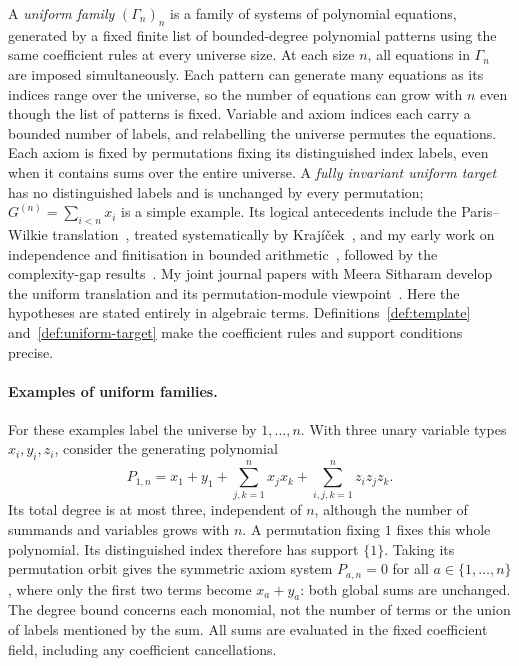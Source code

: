 A \emph{uniform family} $(\Gamma_n)_n$ is a family of systems of
polynomial equations, generated by a fixed finite list of bounded-degree
polynomial patterns using the same coefficient rules at every universe
size. At each size $n$, all equations in $\Gamma_n$ are imposed
simultaneously. Each pattern can generate many equations as its indices
range over the universe, so the number of equations can grow with $n$
even though the list of patterns is fixed.
Variable and axiom indices each carry a bounded number of labels,
and relabelling the universe permutes the equations. Each axiom is fixed
by permutations fixing its distinguished index labels, even when it
contains sums over the entire universe. A \emph{fully invariant uniform
target} has no distinguished labels and is unchanged by every
permutation; $G^{(n)}=\sum_{i<n}x_i$ is a simple example. Its logical
antecedents include the Paris--Wilkie translation~\cite{ParisWilkie},
treated systematically by Kraj\'{i}\v{c}ek~\cite[Chapter~9]{KrajBounded},
and my early work on independence and finitisation in bounded
arithmetic~\cite{RiisThesis,RiisFinitisation}, followed by the
complexity-gap results~\cite{RiisTree,Riis}. My joint journal papers
with Meera Sitharam develop the uniform translation and its
permutation-module viewpoint~\cite{RiisSitharamTautologies,RiisSitharamModules}.
Here the hypotheses are stated entirely in algebraic terms. Definitions~\ref{def:template}
and~\ref{def:uniform-target} make the coefficient rules and support
conditions precise.

\paragraph{Examples of uniform families.}
For these examples label the universe by $1,\ldots,n$. With three
unary variable types $x_i,y_i,z_i$, consider the generating polynomial
\[
 P_{1,n}=x_1+y_1+\sum_{j,k=1}^{n}x_jx_k+
                       \sum_{i,j,k=1}^{n}z_i z_j z_k.
\]
Its total degree is at most three, independent of $n$, although the
number of summands and variables grows with $n$. A permutation fixing
$1$ fixes this whole polynomial. Its distinguished index therefore has
support $\{1\}$. Taking its permutation orbit gives the symmetric axiom
system $P_{a,n}=0$ for all $a\in\{1,\ldots,n\}$, where only the first
two terms become $x_a+y_a$: both global sums are unchanged.
The degree bound concerns each monomial, not the number of terms or
the union of labels mentioned by the sum. All sums are evaluated in
the fixed coefficient field, including any coefficient cancellations.

